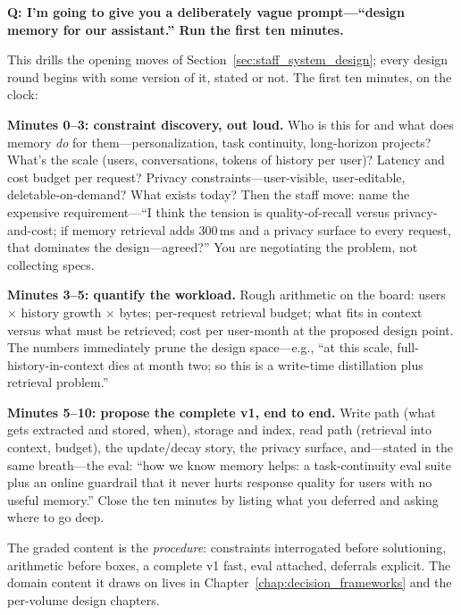 \begin{interviewq}
\textbf{Q: I'm going to give you a deliberately vague prompt---``design memory for our assistant.'' Run the first ten minutes.}

 \quad {} \quad \badgefreq{\freqhigh}

\stronganswer

This drills the opening moves of Section~\ref{sec:staff_system_design}; every design round begins with some version of it, stated or not. The first ten minutes, on the clock:

\textbf{Minutes 0--3: constraint discovery, out loud.} Who is this for and what does memory \textit{do} for them---personalization, task continuity, long-horizon projects? What's the scale (users, conversations, tokens of history per user)? Latency and cost budget per request? Privacy constraints---user-visible, user-editable, deletable-on-demand? What exists today? Then the staff move: name the expensive requirement---``I think the tension is quality-of-recall versus privacy-and-cost; if memory retrieval adds 300\,ms and a privacy surface to every request, that dominates the design---agreed?'' You are negotiating the problem, not collecting specs.

\textbf{Minutes 3--5: quantify the workload.} Rough arithmetic on the board: users $\times$ history growth $\times$ bytes; per-request retrieval budget; what fits in context versus what must be retrieved; cost per user-month at the proposed design point. The numbers immediately prune the design space---e.g., ``at this scale, full-history-in-context dies at month two; so this is a write-time distillation plus retrieval problem.''

\textbf{Minutes 5--10: propose the complete v1, end to end.} Write path (what gets extracted and stored, when), storage and index, read path (retrieval into context, budget), the update/decay story, the privacy surface, and---stated in the same breath---the eval: ``how we know memory helps: a task-continuity eval suite plus an online guardrail that it never hurts response quality for users with no useful memory.'' Close the ten minutes by listing what you deferred and asking where to go deep.

The graded content is the \textit{procedure}: constraints interrogated before solutioning, arithmetic before boxes, a complete v1 fast, eval attached, deferrals explicit. The domain content it draws on lives in Chapter~\ref{chap:decision_frameworks} and the per-volume design chapters.


\end{interviewq}
